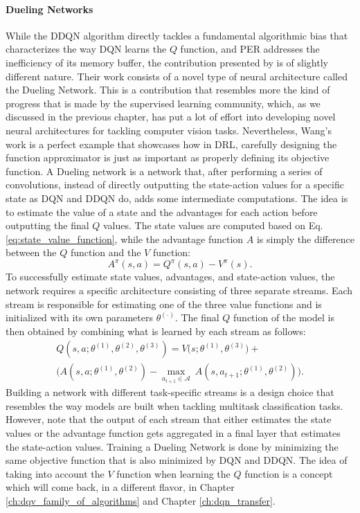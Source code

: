 \paragraph{\textbf{\uppercase{D}ueling \uppercase{N}etworks}} While the DDQN algorithm directly tackles a fundamental algorithmic bias that characterizes the way DQN learns the $Q$ function, and PER addresses the inefficiency of its memory buffer, the contribution presented by \citet{wang2016dueling} is of slightly different nature. Their work consists of a novel type of neural architecture called the Dueling Network. This is a contribution that resembles more the kind of progress that is made by the supervised learning community, which, as we discussed in the previous chapter, has put a lot of effort into developing novel neural architectures for tackling computer vision tasks. Nevertheless, Wang's work is a perfect example that showcases how in DRL, carefully designing the function approximator is just as important as properly defining its objective function. A Dueling network is a network that, after performing a series of convolutions, instead of directly outputting the state-action values for a specific state as DQN and DDQN do, adds some intermediate computations. The idea is to estimate the value of a state and the advantages for each action before outputting the final $Q$ values. The state values are computed based on Eq. \ref{eq:state_value_function}, while the advantage function $A$ is simply the difference between the $Q$ function and the $V$ function:
\begin{equation}
	A^{\pi}(s,a) = Q^{\pi}(s,a) - V^{\pi}(s).
\end{equation}
To successfully estimate state values, advantages, and state-action values, the network requires a specific architecture consisting of three separate streams. Each stream is responsible for estimating one of the three value functions and is initialized with its own parameters $\theta^{(\cdot)}$. The final $Q$ function of the model is then obtained by combining what is learned by each stream as follows:
\begin{multline}
	Q(s,a;\theta^{(1)},\theta^{(2)},\theta^{(3)}) = V\bigl(s;\theta^{(1)},\theta^{(3)}\bigr) + \\
	\bigl(A(s,a;\theta^{(1)},\theta^{(2)}) - \underset{a_{t+1}\in \mathcal{A}}{\max}\: A(s, a_{t+1};\theta^{(1)},\theta^{(2)}) \bigr).
	\label{eq:dueling}
\end{multline}
Building a network with different task-specific streams is a design choice that resembles the way models are built when tackling multitask classification tasks. However, note that the output of each stream that either estimates the state values or the advantage function gets aggregated in a final layer that estimates the state-action values. Training a Dueling Network is done by minimizing the same objective function that is also minimized by DQN and DDQN. The idea of taking into account the $V$ function when learning the $Q$ function is a concept which will come back, in a different flavor, in Chapter \ref{ch:dqv_family_of_algorithms} and Chapter \ref{ch:dqn_transfer}.

